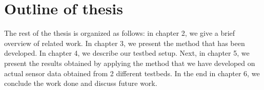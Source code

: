 \section{Outline of thesis}

The rest of the thesis is organized as follows: in chapter 2, we give a brief overview of related work. In chapter 3, we present the method that has been developed. In chapter 4, we describe our testbed setup. Next, in chapter 5, we present the results obtained by applying the method that we have developed on actual sensor data obtained from 2 different testbeds. In the end in chapter 6, we conclude the work done and discuss future work.






\vspace{1\baselineskip}

\noindent

